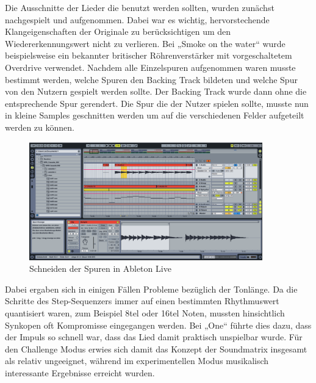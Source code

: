 Die Ausschnitte der Lieder die benutzt werden sollten, wurden zunächst nachgespielt und aufgenommen. Dabei war es wichtig, hervorstechende Klangeigenschaften der Originale zu berücksichtigen um den Wiedererkennungswert nicht zu verlieren. Bei „Smoke on the water“ wurde beispielsweise ein bekannter britischer Röhrenverstärker mit vorgeschaltetem Overdrive verwendet. Nachdem alle Einzelspuren aufgenommen waren musste bestimmt werden, welche Spuren den Backing Track bildeten und welche Spur von den Nutzern gespielt werden sollte. Der Backing Track wurde dann ohne die entsprechende Spur gerendert. Die Spur die der Nutzer spielen sollte, musste nun in kleine Samples geschnitten werden um auf die verschiedenen Felder aufgeteilt werden zu können.

\begin{figure}[htbp] 
  \centering
     \includegraphics[width=0.9\textwidth]{images/Musikkonzeption}
  \caption{Schneiden der Spuren in Ableton Live}
  \label{fig:audio1}
\end{figure}

Dabei ergaben sich in einigen Fällen Probleme bezüglich der Tonlänge. Da die Schritte des Step-Sequenzers immer auf einen bestimmten Rhythmuswert quantisiert waren, zum Beispiel 8tel oder 16tel Noten, mussten hinsichtlich Synkopen oft Kompromisse eingegangen werden. Bei „One“ führte dies dazu, dass der Impuls so schnell war, dass das Lied damit praktisch unspielbar wurde. Für den Challenge Modus erwies sich damit das Konzept der Soundmatrix insgesamt als relativ ungeeignet, während im experimentellen Modus musikalisch interessante Ergebnisse erreicht wurden.